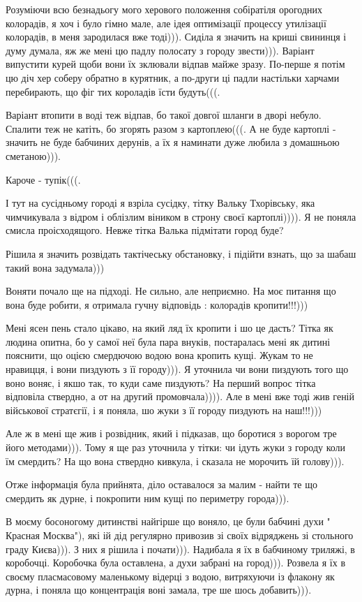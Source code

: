 Розуміючи всю безнадьогу мого херового положення собіратіля орогодних
колорадів, я хоч і було гімно мале, але ідея оптимізації процессу утилізації
колорадів, в меня зародилася вже тоді))). Сиділа я значить на криші свининця і
думу думала, яж же мені цю падлу полосату з городу звести))). Варіант випустити
курей щоби вони їх зклювали відпав майже зразу. По-перше я потім цю діч хер
соберу обратно в курятник, а по-други ці падли настільки харчами перебирають,
що фіг тих короладів їсти будуть(((. 

Варіант втопити в воді теж відпав, бо такої довгої шланги в дворі небуло.
Спалити теж не катіть, бо згорять разом з картоплею(((. А не буде картоплі -
значить не буде бабчиних дерунів, а їх я наминати дуже любила з домашньою
сметаною))).

Кароче - тупік(((.

І тут на сусідньому городі я взріла сусідку, тітку Вальку Тхорівську, яка
чимчикувала з відром і облізлим віником в строну своєї картоплі)))). Я не
поняла смисла проісходящого. Невже тітка Валька підмітати город буде?

Рішила я значить розвідать тактічеську обстановку, і підійти взнать, що за
шабаш такий вона задумала)))

Воняти почало ще на підході. Не сильно, але неприємно. На моє питання що вона
буде робити, я отримала гучну відповідь : колорадів кропити!!!)))

Мені ясен пень стало цікаво, на який ляд їх кропити і шо це дасть? Тітка як
людина опитна, бо у самої неї була пара внуків, постаралась мені як дитині
пояснити, що оцією смердючою водою вона кропить кущі. Жукам то не нравицця, і
вони пиздують з її городу))). Я уточнила чи вони пиздують того що воно воняє, і
якшо так, то куди саме пиздують? На перший вопрос тітка відповіла ствердно, а
от на другий промовчала)))). Але в мені вже тоді жив геній військової
стратєгії, і я поняла, шо жуки з її городу пиздують на наш!!!)))

Але ж в мені ще жив і розвідник, який і підказав, що боротися з ворогом тре
його методами))). Тому я ще раз уточнила у тітки: чи ідуть жуки з городу коли
їм смердить? На що вона ствердно кивкула, і сказала не морочить їй голову))).

Отже інформація була прийнята, діло оставалося за малим - найти те що смердить
як дурне, і покропити ним кущі по периметру города))).

В моєму босоногому дитинстві найгірше що воняло, це були бабчині духи " Красная
Москва"), які ій дід регулярно привозив зі своїх відряджень зі стольного граду
Києва))). З них я рішила і почати))). Надибала я їх в бабчиному триляжі, в
коробочці. Коробочка була оставлена, а духи забрані на город))). Розвела я їх в
своєму пласмасовому маленькому відерці з водою, витряхуючи із флакону як дурна,
і поняла що концентрація воні замала, тре ше шось добавить))). 

